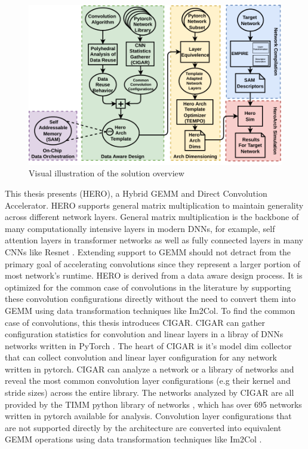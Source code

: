 \begin{figure}[!ht]
  \centering
  \includegraphics[scale=1]{fig/intro.pdf}
  \caption{Visual illustration of the solution overview}
  \label{fig:intro}
\end{figure}

This thesis presents (HERO), a Hybrid GEMM and Direct Convolution Accelerator.  
HERO supports general matrix multiplication to maintain generality across
different network layers. General matrix multiplication is the backbone of many
computationally intensive layers in modern DNNs, for example, self attention
layers in transformer networks \cite{transformer_model} as well as fully
connected layers in many CNNs like Resnet \cite{resnet}. Extending support to
GEMM should not detract from the primary goal of accelerating convolutions since
they represent a larger portion of most network's runtime.  
HERO is derived from a data aware design process. It is optimized for the
common case of convolutions in the literature by supporting these convolution
configurations directly without the need to convert them into GEMM using data
transformation techniques like Im2Col. To find the common case of convolutions,
this thesis introduces \ac{CIGAR}. CIGAR can gather configuration statistics for
convolution and linear layers in a libray of DNNs networks written in PyTorch
\cite{pytorch}. The heart of CIGAR is it's model dim collector that can collect
convolution and linear layer configuration for any network written in pytorch.
CIGAR can analyze a network or a library of networks and reveal the most common
convolution layer configurations (e.g their kernel and stride sizes) across the
entire library. The networks analyzed by CIGAR are all provided by the \ac{TIMM}
python library of networks \cite{timm}, which has over 695 networks written in
pytorch available for analysis. Convolution layer configurations that are not
supported directly by the architecture are converted into equivalent GEMM
operations using data transformation techniques like Im2Col
\cite{cafe_con_troll}. 

